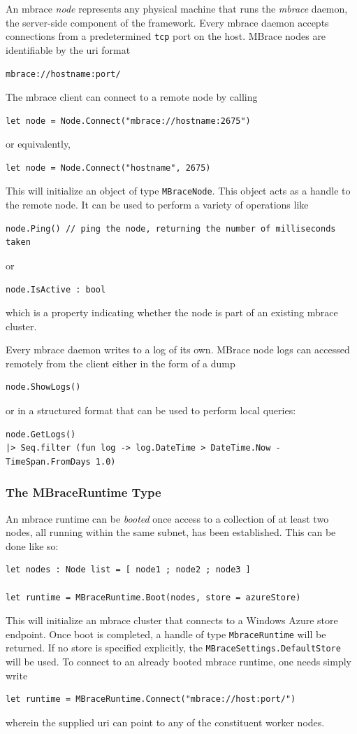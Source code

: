 \documentclass[9pt,a4paper]{article}
\newcommand{\mbrace}{mbrace}
\newcommand{\Mbrace}{MBrace}
\newcommand{\centertt}[1]{\begin{center}\texttt{#1}\end{center}}
\begin{document}
An \mbrace{} \emph{node} represents any physical machine that runs the \emph{\mbrace{}} daemon, 
the server-side component of the framework. Every \mbrace{} daemon accepts connections from a predetermined 
\texttt{tcp} port on the host. \Mbrace{} nodes are identifiable by the uri format
\centertt{mbrace://hostname:port/}
The \mbrace{} client can connect to a remote node by calling
\begin{lstlisting}
let node = Node.Connect("mbrace://hostname:2675")
\end{lstlisting}
or equivalently,
\begin{lstlisting}
let node = Node.Connect("hostname", 2675)
\end{lstlisting}
This will initialize an object of type \texttt{MBraceNode}. This object acts as a handle
to the remote node. It can be used to perform a variety of operations like
\begin{lstlisting}
node.Ping() // ping the node, returning the number of milliseconds taken
\end{lstlisting}
or
\begin{lstlisting}
node.IsActive : bool
\end{lstlisting}
which is a property indicating whether the node is part of an existing \mbrace{} cluster.

Every \mbrace{} daemon writes to a log of its own. \Mbrace{} node logs can accessed remotely
from the client either in the form of a dump
\begin{lstlisting}
node.ShowLogs()
\end{lstlisting}
or in a structured format that can be used to perform local queries:
\begin{lstlisting}
node.GetLogs() 
|> Seq.filter (fun log -> log.DateTime > DateTime.Now - TimeSpan.FromDays 1.0)
\end{lstlisting}

\subsubsection*{The MBraceRuntime Type}

An \mbrace{} runtime can be \emph{booted} once access to a collection of at least two nodes,
all running within the same subnet, has been established. This can be done like so:
\begin{lstlisting}
let nodes : Node list = [ node1 ; node2 ; node3 ]

let runtime = MBraceRuntime.Boot(nodes, store = azureStore)
\end{lstlisting}
This will initialize an \mbrace{} cluster that connects to a Windows Azure store endpoint.
Once boot is completed, a handle of type \texttt{MbraceRuntime} will be returned.
If no store is specified explicitly, the \texttt{MBraceSettings.DefaultStore} will be used.
%
To connect to an already booted \mbrace{} runtime, one needs simply write
\begin{lstlisting}
let runtime = MBraceRuntime.Connect("mbrace://host:port/")
\end{lstlisting}
wherein the supplied uri can point to any of the constituent worker nodes.
\end{document}
